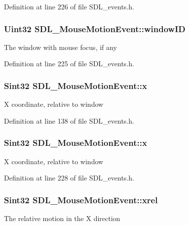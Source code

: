 Definition at line 226 of file S\+D\+L\+\_\+events.\+h.

\hypertarget{structSDL__MouseMotionEvent_aa9976725242ada93a9e18e7fdf5796e6}{
\subsubsection[{window\+I\+D}]{\setlength{\rightskip}{0pt plus 5cm}Uint32 S\+D\+L\+\_\+\+Mouse\+Motion\+Event\+::window\+I\+D}}\label{structSDL__MouseMotionEvent_aa9976725242ada93a9e18e7fdf5796e6}
The window with mouse focus, if any 

Definition at line 225 of file S\+D\+L\+\_\+events.\+h.

\hypertarget{structSDL__MouseMotionEvent_a36398bb4a5308446a262b0bfc8baa80a}{
\subsubsection[{x}]{\setlength{\rightskip}{0pt plus 5cm}Sint32 S\+D\+L\+\_\+\+Mouse\+Motion\+Event\+::x}}\label{structSDL__MouseMotionEvent_a36398bb4a5308446a262b0bfc8baa80a}
X coordinate, relative to window 

Definition at line 138 of file S\+D\+L\+\_\+events.\+h.

\hypertarget{structSDL__MouseMotionEvent_a36398bb4a5308446a262b0bfc8baa80a}{
\subsubsection[{x}]{\setlength{\rightskip}{0pt plus 5cm}Sint32 S\+D\+L\+\_\+\+Mouse\+Motion\+Event\+::x}}\label{structSDL__MouseMotionEvent_a36398bb4a5308446a262b0bfc8baa80a}
X coordinate, relative to window 

Definition at line 228 of file S\+D\+L\+\_\+events.\+h.

\hypertarget{structSDL__MouseMotionEvent_a1c01d9aba2a20778fb45a15dca39ef58}{
\subsubsection[{xrel}]{\setlength{\rightskip}{0pt plus 5cm}Sint32 S\+D\+L\+\_\+\+Mouse\+Motion\+Event\+::xrel}}\label{structSDL__MouseMotionEvent_a1c01d9aba2a20778fb45a15dca39ef58}
The relative motion in the X direction 

